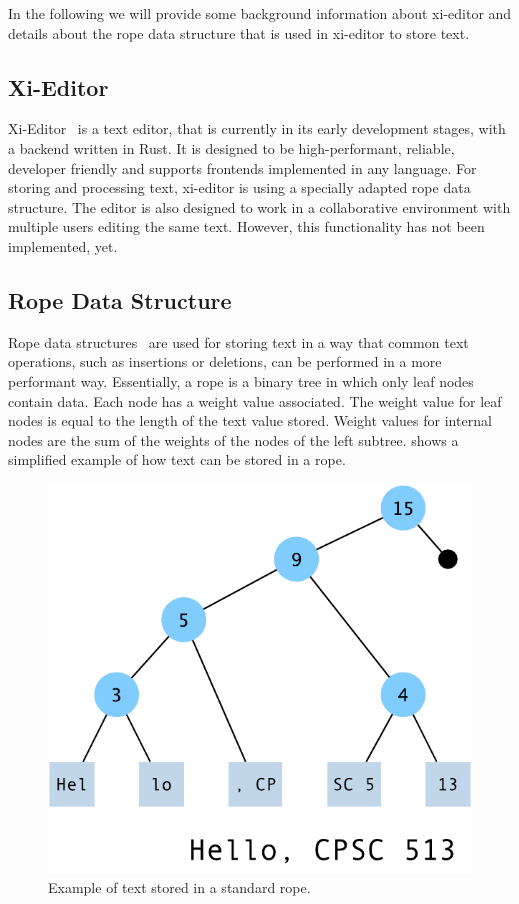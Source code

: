 In the following we will provide some background information about xi-editor and details about the rope data structure that is used in xi-editor to store text.

\subsection{Xi-Editor}

Xi-Editor~\cite{xi} is a text editor, that is currently in its early development stages, with a backend written in Rust. 
It is designed to be high-performant, reliable, developer friendly and supports frontends implemented in any language.
For storing and processing text, xi-editor is using a specially adapted rope data structure.
The editor is also designed to work in a collaborative environment with multiple users editing the same text. 
However, this functionality has not been implemented, yet.

\subsection{Rope Data Structure}

Rope data structures~\cite{boehm1995ropes} are used for storing text in a way that common text operations, such as insertions or deletions, can be performed in a more performant way.
Essentially, a rope is a binary tree in which only leaf nodes contain data. 
Each node has a weight value associated. 
The weight value for leaf nodes is equal to the length of the text value stored.
Weight values for internal nodes are the sum of the weights of the nodes of the left subtree.
 shows a simplified example of how text can be stored in a rope.

\begin{figure}[h]
\centering
\includegraphics[width=0.6\linewidth]{"figures/rope"}
\caption{Example of text stored in a standard rope.}
\label{fig:rope}
\end{figure}

